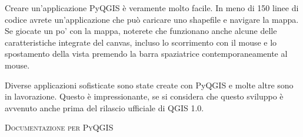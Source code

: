 Creare un'applicazione PyQGIS è veramente molto facile. In meno di 150 linee di codice avrete un'applicazione che può caricare uno shapefile e navigare la mappa. Se giocate un po' con la mappa, noterete che funzionano anche alcune delle caratteristiche integrate del canvas, incluso lo scorrimento con il mouse e lo spostamento della vista premendo la barra spaziatrice  contemporaneamente al mouse.

Diverse applicazioni sofisticate sono state create con PyQGIS e molte altre sono in lavorazione. Questo è impressionante, se si considera che questo sviluppo è avvenuto anche prima del rilascio ufficiale di QGIS 1.0.

\begin{Tip}\caption{\textsc{Documentazione per PyQGIS}}
\end{Tip} 
